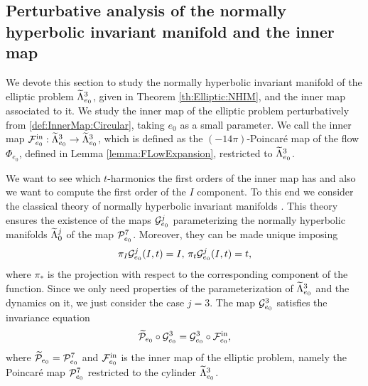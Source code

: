 \subsection{Perturbative analysis of the normally hyperbolic invariant manifold and the inner map}
\label{sec:CylinderExpansion}
We devote this section to study the normally hyperbolic invariant manifold of the elliptic problem $\widetilde\Lambda_{e_0}^3$, given in Theorem \ref{th:Elliptic:NHIM}, and the inner map associated to it. We study the inner map of the elliptic problem perturbatively from \eqref{def:InnerMap:Circular}, taking $e_0$ as a small parameter.   We call the inner map  $\mathcal{F}_{e_0}^{\mathrm{in}}:\widetilde\Lambda^3_{e_0}\rightarrow\widetilde\Lambda^3_{e_0}$, which is defined as the $(-14\pi)$-Poincar{\'e} map of the flow $\Phi_{e_0}$, defined in Lemma \ref{lemma:FLowExpansion}, restricted to $\widetilde\Lambda_{e_0}^3$.

We want to see which $t$-harmonics the first orders of the inner map has and also we want to compute the first order of the $I$ component. To this end we consider the classical theory of normally hyperbolic invariant manifolds \cite{Fenichel74, Fenichel77}. This theory  ensures
the existence of the maps $\mathcal{G}^j_{e_0}$ parameterizing the normally hyperbolic manifolds $\widetilde\Lambda_0^j$ of the map $\mathcal{P}_{e_0}^7$.
Moreover, they can be made unique imposing
\begin{equation}\label{def:UniquenessNHIM}
\pi_I\mathcal{G}^j_{e_0}(I,t)=I,\, \pi_t\mathcal{G}^j_{e_0}(I,t)=t,
\end{equation}
where $\pi_\ast$ is the projection with respect to the corresponding component of the function. Since we only need properties of the parameterization of $\widetilde\Lambda_{e_0}^3$ and the dynamics on it, we just consider the case $j=3$. The map $\mathcal{G}_{e_0}^3$ satisfies the invariance equation
\begin{equation}\label{eq:Invariance:NHIM}
  \widetilde{\mathcal{P}}_{e_0}\circ \mathcal{G}^3_{e_0}= \mathcal{G}^3_{e_0}\circ\mathcal{F}^{\mathrm{in}}_{e_0},
\end{equation}
where $\widetilde{\mathcal{P}}_{e_0}=\mathcal{P}_{e_0}^7$ and $\mathcal{F}_{e_0}^{\mathrm{in}}$ is the inner map
of the elliptic problem, namely the Poincar\'e map $\mathcal{P}_{e_0}^7$ restricted
to the cylinder $\widetilde\Lambda_{e_0}^3$.


